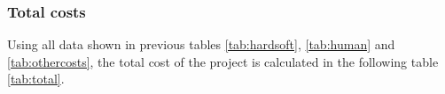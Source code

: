  





\subsubsection{Total costs}
Using all data shown in previous tables \ref{tab:hardsoft}, \ref{tab:human} and \ref{tab:othercosts}, the total cost of the project is calculated in the following table \ref{tab:total}.

